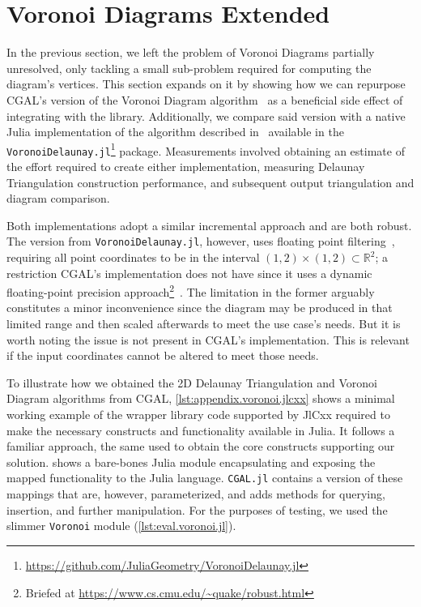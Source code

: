 \section{Voronoi Diagrams Extended}%
\label{sec:eval.voronoi}

In the previous section, we left the problem of Voronoi Diagrams partially
unresolved, only tackling a small sub-problem required for computing the
diagram's vertices.  This section expands on it by showing how we can repurpose
\ac{CGAL}'s version of the Voronoi Diagram algorithm~\cite{CGAL:5.3:VDA2} as a
beneficial side effect of integrating with the library.  Additionally, we
compare said version with a native Julia implementation of the algorithm
described in~\cite{Springel:2010:GCHSMM} available in the
\texttt{VoronoiDelaunay.jl}\footnote{\url{https://github.com/JuliaGeometry/VoronoiDelaunay.jl}}
package.  Measurements involved obtaining an estimate of the effort required to
create either implementation, measuring Delaunay Triangulation construction
performance, and subsequent output triangulation and diagram comparison.

Both implementations adopt a similar incremental approach and are both robust.
The version from \texttt{VoronoiDelaunay.jl}, however, uses floating point
filtering~\cite{Springel:2010:GCHSMM}, requiring all point coordinates to be in
the interval $\left(1, 2\right) \times \left(1, 2\right) \subset \mathbb{R}^2$;
a restriction \ac{CGAL}'s implementation does not have since it uses a dynamic
floating-point precision approach\footnote{Briefed at
\url{https://www.cs.cmu.edu/~quake/robust.html}}~\cite{Shewchuk:1997:APFPAFRGP}.
The limitation in the former arguably constitutes a minor inconvenience since
the diagram may be produced in that limited range and then scaled afterwards to
meet the use case's needs.  But it is worth noting the issue is not present in
\ac{CGAL}'s implementation.  This is relevant if the input coordinates cannot be
altered to meet those needs.

To illustrate how we obtained the 2D Delaunay Triangulation and Voronoi Diagram
algorithms from \ac{CGAL}, \cref{lst:appendix.voronoi.jlcxx} shows a minimal
working example of the wrapper library code supported by JlCxx required to make
the necessary constructs and functionality available in Julia.  It follows a
familiar approach, the same used to obtain the core constructs supporting our
\primitives{} solution.   shows a bare-bones Julia
module encapsulating and exposing the mapped functionality to the Julia
language.  \texttt{CGAL.jl} contains a version of these mappings that are,
however, parameterized, and adds methods for querying, insertion, and further
manipulation.  For the purposes of testing, we used the slimmer \texttt{Voronoi}
module (\cref{lst:eval.voronoi.jl}).

